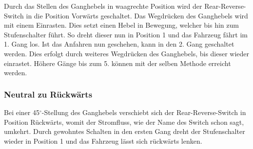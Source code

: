Durch das Stellen des Ganghebels in waagrechte Position wird der Rear-Reverse-Switch in die Position Vorwärts geschaltet. Das Wegdrücken des Ganghebels wird mit einem Einrasten. Dies setzt einen Hebel in Bewegung, welcher bis hin zum Stufenschalter führt. So dreht dieser nun in Position 1 und das Fahrzeug fährt im 1. Gang los. Ist das Anfahren nun geschehen, kann in den 2. Gang geschaltet werden. Dies erfolgt durch weiteres Wegdrücken des Ganghebels, bis dieser wieder einrastet. Höhere Gänge bis zum 5. können mit der selben Methode erreicht werden.

\subsubsection{Neutral zu Rückwärts}

Bei einer 45$^\circ$-Stellung des Ganghebels verschiebt sich der Rear-Reverse-Switch in Position Rückwärts, womit der Stromfluss, wie der Name des Switch schon sagt, umkehrt. Durch gewohntes Schalten in den ersten Gang dreht der Stufenschalter wieder in Position 1 und das Fahrzeug lässt sich rückwärts lenken.